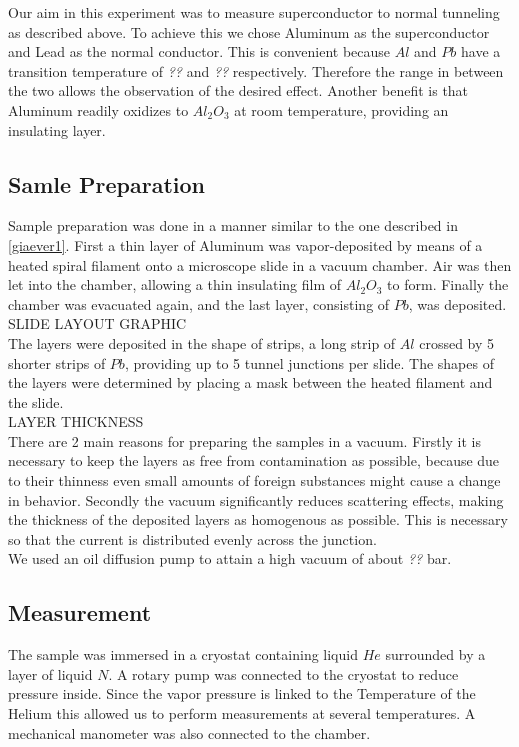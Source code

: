 
Our aim in this experiment was to measure superconductor to normal tunneling as described above. To achieve this we chose Aluminum as the superconductor and Lead as the normal conductor. This is convenient because $Al$ and $Pb$ have a transition temperature of \emph{??} and \emph{??} respectively. Therefore the range in between the two allows the observation of the desired effect. Another benefit is that Aluminum readily oxidizes to $Al_2O_3$ at room temperature, providing an insulating layer.\\

\subsection{Samle Preparation}
Sample preparation was done in a manner similar to the one described in \ref{giaever1}. First a thin layer of Aluminum was vapor-deposited by means of a heated spiral filament onto a microscope slide in a vacuum chamber. Air was then let into the chamber, allowing a thin insulating film of $Al_2O_3$ to form. Finally the chamber was evacuated again, and the last layer, consisting of $Pb$, was deposited.\\

SLIDE LAYOUT GRAPHIC\\

The layers were deposited in the shape of strips, a long strip of $Al$ crossed by 5 shorter strips of $Pb$, providing up to 5 tunnel junctions per slide. The shapes of the layers were determined by placing a mask between the heated filament and the slide.\\

LAYER THICKNESS\\

There are 2 main reasons for preparing the samples in a vacuum. Firstly it is necessary to keep the layers as free from contamination as possible, because due to their thinness even small amounts of foreign substances might cause a change in behavior. Secondly the vacuum significantly reduces scattering effects, making the thickness of the deposited layers as homogenous as possible. This is necessary so that the current is distributed evenly across the junction.\\

We used an oil diffusion pump to attain a high vacuum of about \emph{??} bar.\\

\subsection{Measurement}
The sample was immersed in a cryostat containing liquid $He$ surrounded by a layer of liquid $N$. A rotary pump was connected to the cryostat to reduce pressure inside. Since the vapor pressure is linked to the Temperature of the Helium this allowed us to perform measurements at several temperatures. A mechanical manometer was also connected to the chamber.\\

